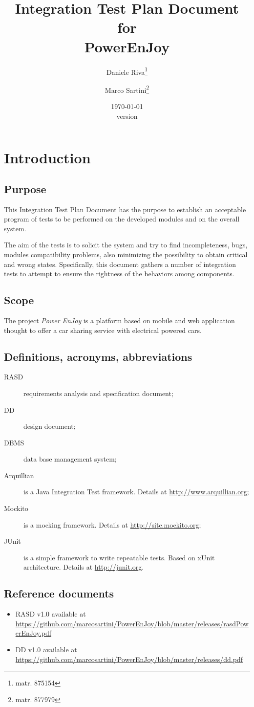 \documentclass{scrreprt}
\title{Integration Test Plan Document\\for\\PowerEnJoy}
\date{\today\\\bigskip version \version}
\author{Daniele Riva\thanks{matr. 875154}\and Marco Sartini\thanks{matr. 877979}}
\begin{document}
\pagestyle{headings}
\maketitle

\tableofcontents

\chapter{Introduction}

\section{Purpose}
This Integration Test Plan Document has the purpose to establish an acceptable program of tests to be performed on the developed modules and on the overall system.

The aim of the tests is to solicit the system and try to find incompleteness, bugs, modules compatibility problems, also minimizing the possibility to obtain critical and wrong states.
Specifically, this document gathers a number of integration tests to attempt to ensure the rightness of the behaviors among components.

\section{Scope}
The project \emph{Power EnJoy} is a platform based on mobile and web application thought to offer a car sharing service with electrical powered cars. 
\section{Definitions, acronyms, abbreviations}
\begin{description}
\item[RASD] requirements analysis and specification document;
\item[DD] design document;
\item[DBMS] data base management system;
\item[Arquillian] is a Java Integration Test framework. Details at \url{http://www.arquillian.org};
\item[Mockito] is a mocking framework. Details at \url{http://site.mockito.org};
\item[JUnit] is a simple framework to write repeatable tests. Based on xUnit architecture. Details at \url{http://junit.org}.
\end{description}
\section{Reference documents}
\begin{itemize}
\item RASD v1.0 available at \url{https://github.com/marcosartini/PowerEnJoy/blob/master/releases/rasdPowerEnJoy.pdf}
\item DD v1.0 available at \url{https://github.com/marcosartini/PowerEnJoy/blob/master/releases/dd.pdf}
\end{itemize}
\end{document}
